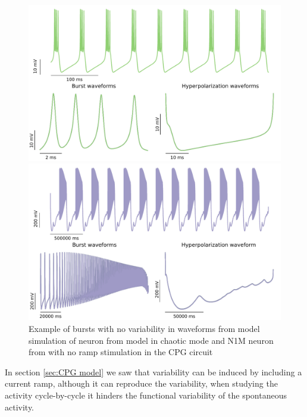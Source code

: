 \begin{figure}[hbt]
	\centering
	\begin{minipage}{0.45\textwidth}
		\includegraphics[width=\textwidth]{img/invariants/variability/GHmodel.pdf}
	\end{minipage}
	\begin{minipage}{0.45\textwidth}
		\includegraphics[width=\textwidth]{img/invariants/variability/N1Mnovar.pdf}
	\end{minipage}
	\caption{Example of bursts with no variability in waveforms from model simulation of neuron from \cite{ghigliazza_minimal_2004} model in chaotic mode and N1M neuron from \cite{vavoulis_dynamic_2007} with no ramp stimulation in the CPG circuit}
	\label{fig:model burst no variability}
\end{figure}



In section \ref{sec:CPG model} we saw that variability can be induced by including a current ramp, although it can reproduce the variability, when studying the activity cycle-by-cycle it hinders the functional variability of the spontaneous activity. 


